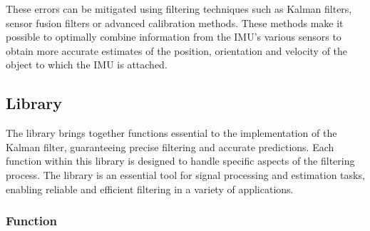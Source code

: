 These errors can be mitigated using filtering techniques such as Kalman filters, sensor fusion filters or advanced calibration methods. These methods make it possible to optimally combine information from the IMU's various sensors to obtain more accurate estimates of the position, orientation and velocity of the object to which the IMU is attached. \cite{pmc_kalman_filter:2025}


\subsection{Library }

The  library brings together functions essential to the implementation of the Kalman filter, guaranteeing precise filtering and accurate predictions. Each function within this library is designed to handle specific aspects of the filtering process. The library   is an essential tool for signal processing and estimation tasks, enabling reliable and efficient filtering in a variety of applications.  \cite{arduino_kalman:2024}



\subsubsection{Function}

